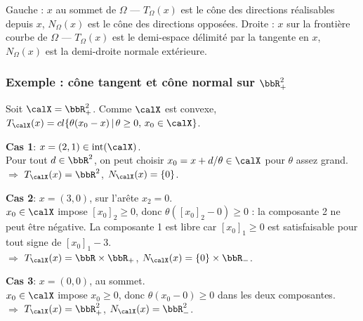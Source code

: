 \documentclass[t,aspectratio=169,usepdftitle=false]{beamer}
\def\cX{\calX}
\begin{document}
\begin{frame}
\begin{center}
\begin{tikzpicture}[scale=0.85]
\end{tikzpicture}
\end{center}

\smallskip
{\footnotesize
Gauche : $x$ au sommet de $\Omega$ — $T_\Omega(x)$ est le cône des directions réalisables depuis $x$,
$N_\Omega(x)$ est le cône des directions opposées.
\quad
Droite : $x$ sur la frontière courbe de $\Omega$ — $T_\Omega(x)$ est le demi-espace délimité par la tangente en $x$, $N_\Omega(x)$ est la demi-droite normale extérieure.}

\end{frame}

\begin{frame}
\frametitle{Exemple : cône tangent et cône normal sur $\bbR^2_+$}

Soit $\cX = \bbR^2_+$.
Comme $\cX$ est convexe, $T_{\cX}(x) = cl\lbrace \theta(x_0-x) \,|\, \theta \geq 0,\, x_0 \in \cX \rbrace$.

\medskip

\textbf{Cas 1}: $x = (2, 1) \in \mathrm{int}(\cX)$.\\
Pour tout $d \in \bbR^2$, on peut choisir $x_0 = x + d/\theta \in \cX$ pour $\theta$ assez grand.\\
$\Rightarrow$ $T_{\cX}(x) = \bbR^2$, \quad $N_{\cX}(x) = \lbrace 0 \rbrace$.

\medskip

\textbf{Cas 2}: $x = (3, 0)$, sur l'arête $x_2 = 0$.\\
$x_0 \in \cX$ impose $[x_0]_2 \geq 0$, donc $\theta([x_0]_2 - 0) \geq 0$ : la composante 2 ne peut être négative. La composante 1 est libre car $[x_0]_1 \geq 0$ est satisfaisable pour tout signe de $[x_0]_1 - 3$.\\
$\Rightarrow$ $T_{\cX}(x) = \bbR \times \bbR_+$, \quad
$N_{\cX}(x) = \lbrace 0 \rbrace \times \bbR_-$.

\medskip

\textbf{Cas 3}: $x = (0, 0)$, au sommet.\\
$x_0 \in \cX$ impose $x_0 \geq 0$, donc $\theta(x_0 - 0) \geq 0$ dans les deux composantes.\\
$\Rightarrow$ $T_{\cX}(x) = \bbR^2_+$, \quad
$N_{\cX}(x) = \bbR^2_-$.

\end{frame}
\end{document}

